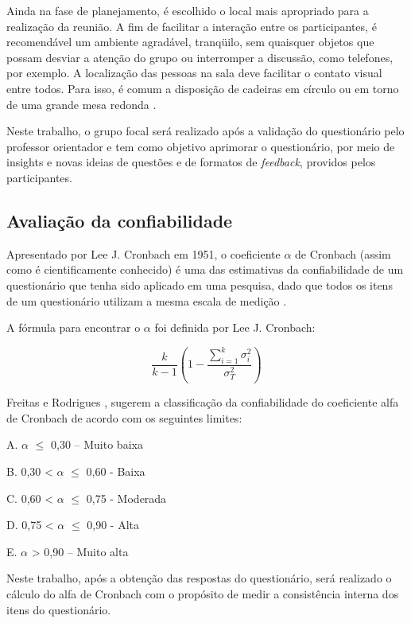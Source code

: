 Ainda na fase de planejamento, é escolhido o local mais apropriado para a
realização da reunião. A fim de facilitar a interação entre os participantes, é recomendável
um ambiente agradável, tranqüilo, sem quaisquer objetos que possam desviar a atenção do
grupo ou interromper a discussão, como telefones, por exemplo. A localização das pessoas
na sala deve facilitar o contato visual entre todos. Para isso, é comum a disposição de
cadeiras em círculo ou em torno de uma grande mesa redonda \cite{dias2000grupo}.

Neste trabalho, o grupo focal será realizado após a validação do questionário pelo professor orientador e tem como objetivo aprimorar o questionário, por meio de insights e novas ideias de questões e de formatos de \textit{feedback}, providos pelos participantes.

\subsection{Avaliação da confiabilidade}

Apresentado por Lee J. Cronbach em 1951, o coeficiente $\alpha$ de Cronbach \cite{enegep2010} (assim como é cientificamente conhecido) é uma das estimativas da confiabilidade de um questionário que tenha sido aplicado em uma pesquisa, dado que todos os itens de um questionário utilizam a mesma escala de medição \cite{freitas2005avaliaccao}.

A fórmula para encontrar o $\alpha$ foi definida por Lee J. Cronbach:

\begin{equation}
\frac{k}{k-1} \left(1 - \frac{\sum_{i=1}^{k} \sigma_{i}^2}{\sigma_{T}^2}\right)
\end{equation}

Freitas e Rodrigues \cite{freitas2005avaliaccao}, sugerem a classificação da confiabilidade do coeficiente alfa de Cronbach de acordo com os seguintes limites:

A. $\alpha$ $\leq$ 0,30 – Muito baixa

B. 0,30 < $\alpha$ $\leq$ 0,60 - Baixa

C. 0,60 < $\alpha$ $\leq$ 0,75 - Moderada

D. 0,75 < $\alpha$ $\leq$ 0,90 - Alta

E. $\alpha$ > 0,90 – Muito alta

Neste trabalho, após a obtenção das respostas do questionário, será realizado o cálculo do alfa de Cronbach com o propósito de medir a consistência interna dos itens do questionário.

